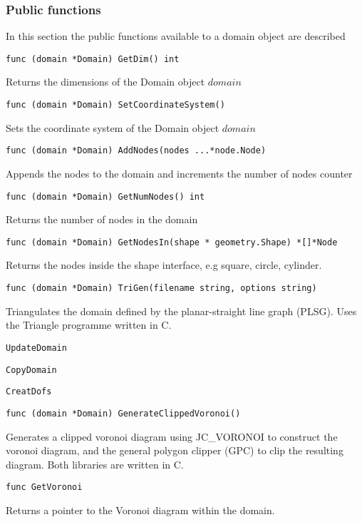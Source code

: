 \subsubsection*{Public functions}
In this section the public functions available to a domain object are described
\begin{lstlisting}
func (domain *Domain) GetDim() int 
\end{lstlisting}
Returns the dimensions of the Domain object $domain$
\begin{lstlisting}
func (domain *Domain) SetCoordinateSystem() 
\end{lstlisting}
Sets the coordinate system of the Domain object $domain$
\begin{lstlisting}
func (domain *Domain) AddNodes(nodes ...*node.Node) 
\end{lstlisting}
Appends the nodes to the domain and increments the number of nodes counter
\begin{lstlisting}
func (domain *Domain) GetNumNodes() int 
\end{lstlisting}
Returns the number of nodes in the domain
\begin{lstlisting}
func (domain *Domain) GetNodesIn(shape * geometry.Shape) *[]*Node
\end{lstlisting}
Returns the nodes inside the shape interface, e.g square, circle, cylinder.
\begin{lstlisting}
func (domain *Domain) TriGen(filename string, options string)
\end{lstlisting}
Triangulates the domain defined by the planar-straight line graph (PLSG). Uses the Triangle programme written in C.
\begin{lstlisting}
UpdateDomain
\end{lstlisting}
\begin{lstlisting}
CopyDomain
\end{lstlisting}
\begin{lstlisting}
CreatDofs
\end{lstlisting}
\begin{lstlisting}
func (domain *Domain) GenerateClippedVoronoi()
\end{lstlisting}
Generates a clipped voronoi diagram using JC\_VORONOI to construct the voronoi diagram, and the general polygon clipper (GPC) to clip the resulting diagram. Both libraries are written in C. 
\begin{lstlisting}
func GetVoronoi
\end{lstlisting}
Returns a pointer to the Voronoi diagram within the domain.

